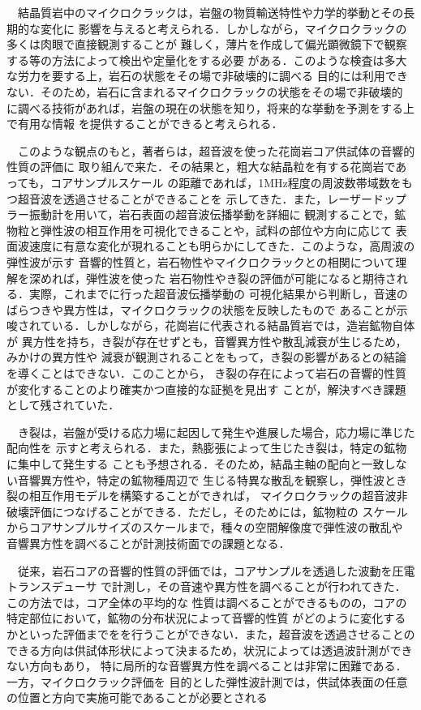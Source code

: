 ﻿　結晶質岩中のマイクロクラックは，岩盤の物質輸送特性や力学的挙動とその長期的な変化に
影響を与えると考えられる．しかしながら，マイクロクラックの多くは肉眼で直接観測することが
難しく，薄片を作成して偏光顕微鏡下で観察する等の方法によって検出や定量化をする必要
がある．このような検査は多大な労力を要する上，岩石の状態をその場で非破壊的に調べる
目的には利用できない．そのため，岩石に含まれるマイクロクラックの状態をその場で非破壊的
に調べる技術があれば，岩盤の現在の状態を知り，将来的な挙動を予測をする上で有用な情報
を提供することができると考えられる．

　このような観点のもと，著者らは，超音波を使った花崗岩コア供試体の音響的性質の評価に
取り組んで来た．その結果と，粗大な結晶粒を有する花崗岩であっても，コアサンプルスケール
の距離であれば，1MHz程度の周波数帯域数をもつ超音波を透過させることができることを
示してきた．また，レーザードップラー振動計を用いて，岩石表面の超音波伝播挙動を詳細に
観測することで，鉱物粒と弾性波の相互作用を可視化できることや，試料の部位や方向に応じて
表面波速度に有意な変化が現れることも明らかにしてきた．このような，高周波の弾性波が示す
音響的性質と，岩石物性やマイクロクラックとの相関について理解を深めれば，弾性波を使った
岩石物性やき裂の評価が可能になると期待される．実際，これまでに行った超音波伝播挙動の
可視化結果から判断し，音速のばらつきや異方性は，マイクロクラックの状態を反映したもので
あることが示唆されている．しかしながら，花崗岩に代表される結晶質岩では，造岩鉱物自体が
異方性を持ち，き裂が存在せずとも，音響異方性や散乱減衰が生じるため，みかけの異方性や
減衰が観測されることをもって，き裂の影響があるとの結論を導くことはできない．このことから，
き裂の存在によって岩石の音響的性質が変化することのより確実かつ直接的な証拠を見出す
ことが，解決すべき課題として残されていた．

　き裂は，岩盤が受ける応力場に起因して発生や進展した場合，応力場に準じた配向性を
示すと考えられる．また，熱膨張によって生じたき裂は，特定の鉱物に集中して発生する
ことも予想される．そのため，結晶主軸の配向と一致しない音響異方性や，特定の鉱物種周辺で
生じる特異な散乱を観察し，弾性波とき裂の相互作用モデルを構築することができれば，
マイクロクラックの超音波非破壊評価につなげることができる．ただし，そのためには，鉱物粒の
スケールからコアサンプルサイズのスケールまで，種々の空間解像度で弾性波の散乱や
音響異方性を調べることが計測技術面での課題となる．

　従来，岩石コアの音響的性質の評価では，コアサンプルを透過した波動を圧電トランスデューサ
で計測し，その音速や異方性を調べることが行われてきた．この方法では，コア全体の平均的な
性質は調べることができるものの，コアの特定部位において，鉱物の分布状況によって音響的性質
がどのように変化するかといった評価までをを行うことができない．また，超音波を透過させることの
できる方向は供試体形状によって決まるため，状況によっては透過波計測ができない方向もあり，
特に局所的な音響異方性を調べることは非常に困難である．一方，マイクロクラック評価を
目的とした弾性波計測では，供試体表面の任意の位置と方向で実施可能であることが必要とされる

